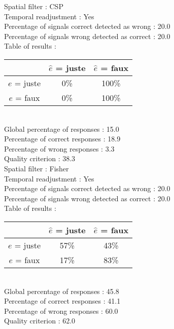 Spatial filter : CSP \\
Temporal readjustment : Yes \\
Percentage of signals correct detected as wrong :   20.0 \\
Percentage of signals wrong detected as correct :   20.0 \\
Table of results : \\
\begin{tabular}{|c|c|c|}
\hline				& $\hat{e}$ = juste & $\hat{e}$ = faux \\
\hline  $e$ = juste	&      0\%			&    100\%		\\
\hline  $e$ = faux	&      0\%			&    100\%		\\
\hline
\end{tabular}\\
Global percentage of responses :   15.0 \\
Percentage of correct responses :   18.9 \\
Percentage of wrong responses :    3.3 \\
Quality criterion :   38.3 \\

Spatial filter : Fisher \\
Temporal readjustment : Yes \\
Percentage of signals correct detected as wrong :   20.0 \\
Percentage of signals wrong detected as correct :   20.0 \\
Table of results : \\
\begin{tabular}{|c|c|c|}
\hline				& $\hat{e}$ = juste & $\hat{e}$ = faux \\
\hline  $e$ = juste	&     57\%			&     43\%		\\
\hline  $e$ = faux	&     17\%			&     83\%		\\
\hline
\end{tabular}\\
Global percentage of responses :   45.8 \\
Percentage of correct responses :   41.1 \\
Percentage of wrong responses :   60.0 \\
Quality criterion :   62.0 \\

